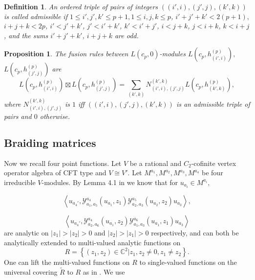\documentclass{article}
\newtheorem{proposition}[lemma]{Proposition}
\newtheorem{definition}[lemma]{Definition}
\begin{document}
	\begin{definition} An ordered triple of pairs of integers $\left(\left(i',i\right),\left(j',j\right),\left(k',k\right)\right)$
		is called \emph{admissible }if $1\le i',j',k'\le p+1,1\le i,j,k\le p$,
		$i'+j'+k'<2\left(p+1\right),$ $i+j+k<2p$, $i'<j'+k'$, $j'<i'+k'$,
		$k'<i'+j'$, $i<j+k$, $j<i+k$, $k<i+j$, and the sums $i'+j'+k'$,
		$i+j+k$ are odd. \end{definition}
	
	\begin{proposition} \label{fusion rules of virasoro modules}The
		fusion rules between $L\left(c_{p},0\right)$-modules $L\left(c_{p},h_{\left(i',i\right)}^{\left(p\right)}\right),$
		$L\left(c_{p},h_{\left(j',j\right)}^{\left(p\right)}\right)$ are
		\[
		L\left(c_{p},h_{\left(i',i\right)}^{\left(p\right)}\right)\boxtimes L\left(c_{p},h_{\left(j',j\right)}^{\left(p\right)}\right)=
		\sum_{\left(k',k\right)}N_{\left(i',i\right),\left(j',j\right)}^{\left(k',k\right)}L\left(c_{p},h_{\left(k',k\right)}^{\left(p\right)}\right),
		\]
		where $N_{\left(i',i\right),\left(j',j\right)}^{\left(k',k\right)}$
		is $1$ iff $\left(\left(i',i\right),\left(j',j\right),\left(k',k\right)\right)$
		is an admissible triple of pairs and $0$ otherwise. \end{proposition}
	
	\subsection{\label{subsec:Braiding-matrix}Braiding matrices}
	
	Now we recall four point functions. Let $V$ be a rational and $C_{2}$-cofinite
	vertex operator algebra of CFT type and $V\cong V'$. Let $M^{a_{1}},M^{a_{2}},M^{a_{3}},M^{a_{4}}$
	be four irreducible $V$-modules. By Lemma 4.1 in \cite{H1} we know
	that for $u_{a_{i}}\in M^{a_{i}},$
	
	\[
	\left\langle u_{a_{4}'},\mathcal{Y}_{a_{1},a_{5}}^{a_{4}}\left(u_{a_{1}},z_{1}\right)\mathcal{Y}_{a_{2},a_{3}}^{a_{5}}
	\left(u_{a_{2}},z_{2}\right)u_{a_{3}}\right\rangle ,
	\]
	
	\[
	\left\langle u_{a_{4}'},\mathcal{Y}_{a_{2},a_{6}}^{a_{4}}\left(u_{a_{1}},z_{2}\right)\mathcal{Y}_{a_{1},a_{3}}^{a_{6}}\left(u_{a_{1}},z_{1}\right)u_{a_{3}}\right\rangle
	\]
	are analytic on $\left|z_{1}\right|>\left|z_{2}\right|>0$ and $\left|z_{2}\right|>\left|z_{1}\right|>0$
	respectively, and can both be analytically extended to multi-valued
	analytic functions on
	\[
	R=\left\{ \left(z_{1},z_{2}\right)\in\mathbb{C}^{2}|z_{1},z_{2}\not=0,z_{1}\not=z_{2}\right\} .
	\]
	One can lift the multi-valued functions on $R$ to single-valued functions
	on the universal covering $\tilde{R}$ to $R$ as in \cite{H1}. We
	use
	
\end{document}
